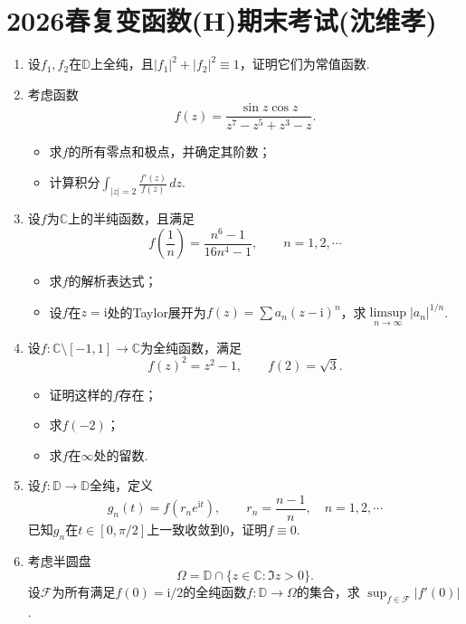 \newcommand{\ii}{\mathrm{i}}

\section{2026春复变函数(H)期末考试(沈维孝)}
\begin{enumerate}
    \item 设$f_{1}, f_{2}$在$\mathbb{D}$上全纯，且$|f_{1}|^{2}+|f_{2}|^{2}\equiv 1$，证明它们为常值函数.
    \item 考虑函数
    $$
    f(z)=\frac{\sin z\cos z}{z^{7}-z^{5}+z^{3}-z}.
    $$
    \begin{itemize}
        \item[(1)] 求$f$的所有零点和极点，并确定其阶数；
        \item[(2)] 计算积分$\displaystyle\int_{|z|=2}\frac{f'(z)}{f(z)}\,dz$.
    \end{itemize}
    \item 设$f$为$\mathbb{C}$上的半纯函数，且满足
    $$
    f\left(\frac{1}{n}\right)=\frac{n^{6}-1}{16n^{4}-1},\qquad n=1,2,\cdots
    $$
    \begin{itemize}
        \item[(1)] 求$f$的解析表达式；
        \item[(2)] 设$f$在$z=\ii$处的Taylor展开为$f(z)=\sum a_{n}(z-\ii)^{n}$，求$\limsup\limits_{n\to\infty}|a_{n}|^{1/n}$.
    \end{itemize}
    \item 设$f:\mathbb{C}\setminus[-1,1]\to\mathbb{C}$为全纯函数，满足
    $$
    f(z)^{2}=z^{2}-1,\qquad f(2)=\sqrt{3}.
    $$
    \begin{itemize}
        \item[(1)] 证明这样的$f$存在；
        \item[(2)] 求$f(-2)$；
        \item[(3)] 求$f$在$\infty$处的留数.
    \end{itemize}
    \item 设$f:\mathbb{D}\to\mathbb{D}$全纯，定义
    $$
    g_{n}(t)=f(r_{n}e^{\ii t}),\qquad r_{n}=\frac{n-1}{n},\quad n=1,2,\cdots
    $$
    已知$g_{n}$在$t\in[0,\pi/2]$上一致收敛到$0$，证明$f\equiv 0$.
    \item 考虑半圆盘
    $$
    \Omega=\mathbb{D}\cap\{z\in\mathbb{C}:\Im z>0\}.
    $$
    设$\mathcal{F}$为所有满足$f(0)=\ii/2$的全纯函数$f:\mathbb{D}\to\Omega$的集合，求 $\sup_{f\in\mathcal{F}}|f'(0)|$.
\end{enumerate}


